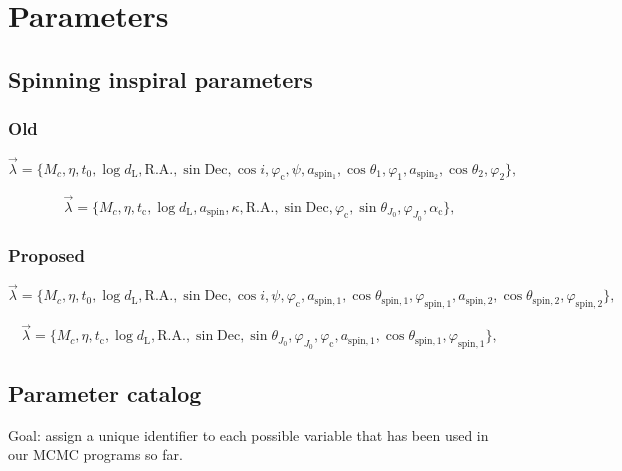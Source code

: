 \documentclass[11pt]{article}
\begin{document}
\section{Parameters}

\subsection{Spinning inspiral parameters}

\subsubsection{Old}
\begin{equation}
  \vec{\lambda} = \{M_c, \eta, t_\mathrm{0}, \log{d_\mathrm{L}}, \mathrm{R.A.}, \sin\mathrm{Dec}, \cos{i}, \varphi_\mathrm{c}, \psi, a_\mathrm{spin_1}, \cos{\theta_1}, \varphi_1, a_\mathrm{spin_2}, \cos{\theta_2}, \varphi_2\},
\end{equation}

\begin{equation}
  \vec{\lambda} = \{M_c, \eta, t_\mathrm{c}, \log{d_\mathrm{L}}, a_\mathrm{spin}, \kappa, \mathrm{R.A.},\sin\mathrm{Dec}, \varphi_\mathrm{c}, \sin\theta_{J_0}, \varphi_{J_0}, \alpha_\mathrm{c}\},
\end{equation}


\subsubsection{Proposed}
\begin{equation}
  \vec{\lambda} = \{M_c, \eta, t_\mathrm{0}, \log{d_\mathrm{L}}, \mathrm{R.A.}, \sin\mathrm{Dec}, \cos{i},          \psi,          \varphi_\mathrm{c}, a_\mathrm{spin,1}, \cos{\theta_\mathrm{spin,1}}, \varphi_\mathrm{spin,1}, a_\mathrm{spin,2}, \cos{\theta_\mathrm{spin,2}}, \varphi_\mathrm{spin,2}\},
\end{equation}

\begin{equation}
  \vec{\lambda} = \{M_c, \eta, t_\mathrm{c}, \log{d_\mathrm{L}}, \mathrm{R.A.}, \sin\mathrm{Dec}, \sin\theta_{J_0}, \varphi_{J_0}, \varphi_\mathrm{c},  a_\mathrm{spin,1}, \cos{\theta_\mathrm{spin,1}}, \varphi_\mathrm{spin,1}\},
\end{equation}






\subsection{Parameter catalog}
Goal: assign a unique identifier to each possible variable that has been used in our MCMC programs so far.
\end{document}
